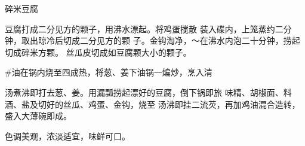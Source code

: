 \begin{recipe}{碎米豆腐}

\ingredients


\cooking

\step 豆腐打成二分见方的颗子，用沸水漂起。将鸡蛋搅散 装入碟内，上笼蒸约二分钟，取出晾冷后切成二分见方的颗 子。金钩淘净，〜在沸水内泡二十分钟，捞起切成碎米方颗。 丝瓜皮切成如豆腐颗大小的颗子。

\step #油在锅内烧至四成热，将葱、姜下油锅一煸炒，烹入清

汤煮沸即打去葱、姜。用漏瓢捞起漂好的豆腐，倒下锅即旅 味精、胡椒面、料酒、盐及切好的丝瓜、鸡蛋、金钩，烧至 汤沸即挂二流芡，再加鸡油混合造转，盛入大薄碗即成。

\notes

色调美观，浓淡适宜，味鲜可口。

\end{recipe}

